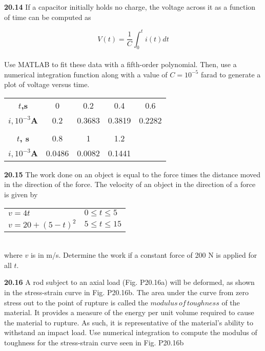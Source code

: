 \documentclass[../main.tex]{subfiles}
\begin{document}
\begin{multicols}{2}
\textbf{20.14} If a capacitor initially holds no charge, the voltage
across it as a function of time can be computed as 

	$$V(t) = \dfrac{1}{C} \int^{t}_{0} i(t) dt$$\\
Use MATLAB to fit these data with a fifth-order polynomial.
Then, use a numerical integration function along with a value
of $C = 10^{−5}$ farad to generate a plot of voltage versus time.\\
\begin{tabular}{ccccc}
	\hline

\textbf{$t$,s} & 0 & 0.2 & 0.4 & 0.6\\

\textbf{$i, 10^{-3}$A} & 0.2 &  0.3683 &  0.3819 &  0.2282\\

\vspace{0in}\\

\textbf{$t$, s} & 0.8 & 1 & 1.2 & \vspace{0in}\\

\textbf{$i, 10^{-3}$A} & 0.0486 & 0.0082 & 0.1441 & \vspace{0in}\\ \hline
\end{tabular}


\textbf{20.15} The work done on an object is equal to the force times
the distance moved in the direction of the force. The velocity of an object in the direction of a force is given by\\
\begin{tabular}{ll}
$v =4t$ & $0 \leq t \leq 5$\\
$v = 20 + (5-t)^{2}$  &  $5 \leq t \leq 15$
\end{tabular}\\
where $v$ is in m/s. Determine the work if a constant force of
200 N is applied for all $t$.

\textbf{20.16} A rod subject to an axial load (Fig. P20.16a) will be
deformed, as shown in the stress-strain curve in Fig. P20.16b. The area under the curve from zero stress out to the point of
rupture is called the $modulus\, of\, toughness$ of the material. It
provides a measure of the energy per unit volume required to
cause the material to rupture. As such, it is representative of
the material's ability to withstand an impact load. Use numerical integration to compute the modulus of toughness for
the stress-strain curve seen in Fig. P20.16b


\end{multicols}
\end{document}
